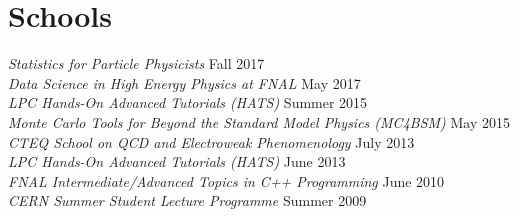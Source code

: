 \section{Schools}
{\sl Statistics for Particle Physicists} \hfill Fall 2017\\
{\sl Data Science in High Energy Physics at FNAL} \hfill May 2017\\
{\sl LPC Hands-On Advanced Tutorials (HATS)} \hfill Summer 2015\\
{\sl Monte Carlo Tools for Beyond the Standard Model Physics (MC4BSM)} \hfill May 2015\\
{\sl CTEQ School on QCD and Electroweak Phenomenology} \hfill July 2013\\
{\sl LPC Hands-On Advanced Tutorials (HATS)} \hfill June 2013\\
{\sl FNAL Intermediate/Advanced Topics in C++ Programming} \hfill June 2010\\
{\sl CERN Summer Student Lecture Programme} \hfill Summer 2009\\
